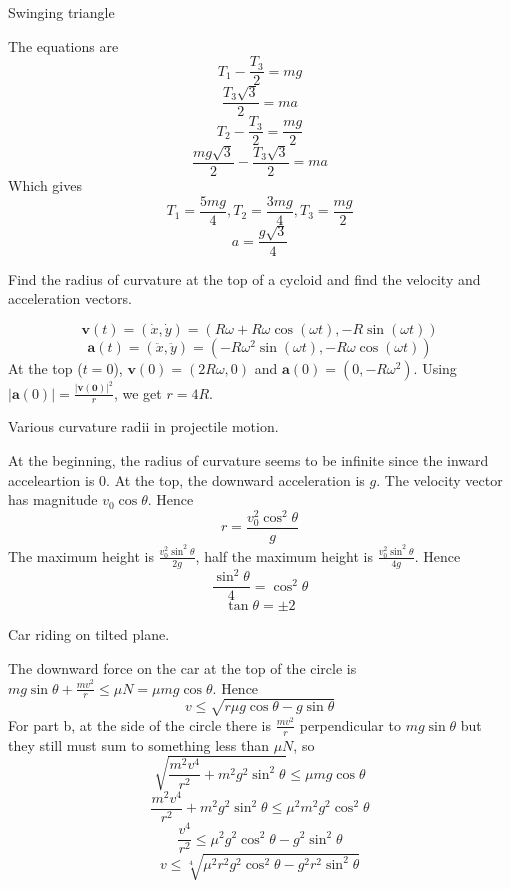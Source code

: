 \documentclass[11pt]{scrartcl}
\begin{document}
\begin{example}
  [3.59]
  Swinging triangle
\end{example}
\begin{soln}
  The equations are
  $$T_1-\frac{T_3}{2}=mg$$
  $$\frac{T_3\sqrt{3}}{2}=ma$$
  $$T_2-\frac{T_3}{2}=\frac{mg}{2}$$
  $$\frac{mg\sqrt{3}}{2}-\frac{T_3\sqrt{3}}{2}=ma$$
  Which gives
  $$T_1=\frac{5mg}{4}, T_2=\frac{3mg}{4}, T_3=\frac{mg}{2}$$
  $$a=\frac{g\sqrt{3}}{4}$$
\end{soln}
\begin{example}
  [3.61]
  Find the radius of curvature at the top of a cycloid and find the velocity and acceleration vectors.
\end{example}
\begin{soln}
  $$\mathbf{v}(t)=(\dot{x}, \dot{y})=(R\omega+R\omega\cos(\omega t), -R\sin(\omega t))$$
  $$\mathbf{a}(t)=(\ddot{x}, \ddot{y})=(-R\omega^2\sin(\omega t), -R\omega \cos(\omega t))$$
  At the top ($t=0$), $\mathbf{v}(0)=(2R\omega, 0)$ and $\mathbf{a}(0)=(0,-R\omega^2)$.
  Using $|\mathbf{a}(0)|=\frac{|\mathbf{v(0)}|^2}{r}$, we get $r=4R$.
\end{soln}
\begin{example}
  [3.62]
  Various curvature radii in projectile motion.
\end{example}
\begin{soln}
  At the beginning, the radius of curvature seems to be infinite since the
  inward acceleartion is $0$. At the top, the downward acceleration is $g$.
  The velocity vector has magnitude $v_0\cos\theta$. Hence
  $$r=\frac{v_0^2\cos^2\theta}{g}$$
  The maximum height is $\frac{v_0^2\sin^2\theta}{2g}$, half the maximum height
  is $\frac{v_0^2\sin^2\theta}{4g}$. Hence
  $$\frac{\sin^2\theta}{4}=\cos^2\theta$$
  $$\tan\theta=\pm 2$$
\end{soln}
\begin{example}
  [3.63]
  Car riding on tilted plane.
\end{example}
\begin{soln}
  The downward force on the car at the top of the circle is $mg\sin\theta+\frac{mv^2}{r}\le \mu N=\mu mg\cos\theta$.
  Hence
  $$v\le \sqrt{r\mu g\cos\theta-g\sin\theta}$$
  For part b, at the side of the circle there is $\frac{mv^2}{r}$ perpendicular
  to $mg\sin\theta$ but they still must sum to something less than $\mu N$, so
  $$\sqrt{\frac{m^2v^4}{r^2}+m^2g^2\sin^2\theta}\le \mu mg\cos\theta$$
  $$\frac{m^2v^4}{r^2}+m^2g^2\sin^2\theta \le \mu^2 m^2 g^2 \cos^2 \theta$$
  $$\frac{v^4}{r^2}\le \mu^2 g^2\cos^2\theta-g^2\sin^2\theta$$
  $$v\le \sqrt[4]{\mu^2 r^2 g^2 \cos^2\theta-g^2r^2\sin^2\theta}$$
\end{soln}
\end{document}
